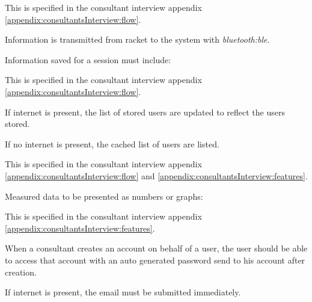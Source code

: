 
This  is specified in the consultant interview appendix \ref{appendix:consultantsInterview:flow}.

Information is transmitted from racket to the system with \textit{\gls{bluetooth:ble}}. 

Information saved for a session must include: \newline
{}


This  is specified in the consultant interview appendix \ref{appendix:consultantsInterview:flow}.

If internet is present, the list of stored users are updated to reflect the users stored.

If no internet is present, the cached list of users are listed.


This  is specified in the consultant interview appendix \ref{appendix:consultantsInterview:flow} and \ref{appendix:consultantsInterview:features}.

Measured data to be presented as numbers or graphs: \newline
{}


This  is specified in the consultant interview appendix \ref{appendix:consultantsInterview:features}.

When a consultant creates an account on behalf of a user, the user should be able to access that account with an auto generated password send to his account after creation.

If internet is present, the email must be submitted immediately.

